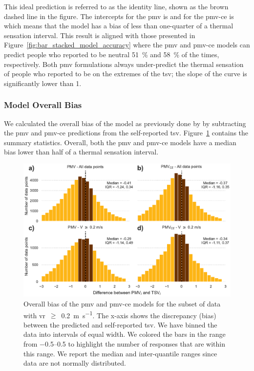 This ideal prediction is referred to as the identity line, shown as the brown dashed line in the figure.
The intercepts for the \ac{pmv} is  and for the \ac{pmv-ce} is  which means that the model has a bias of less than one-quarter of a thermal sensation interval.
This result is aligned with those presented in Figure~\ref{fig:bar_stacked_model_accuracy} where the \ac{pmv} and \ac{pmv-ce} models can predict people who reported to be neutral \qty{51}{\percent} and \qty{58}{\percent} of the times, respectively.
Both \ac{pmv} formulations always under-predict the thermal sensation of people who reported to be on the extremes of the \ac{tsv};
the slope of the curve is significantly lower than 1.

\subsubsection{Model Overall Bias}\label{subsubsec:model-overall-bias}
We calculated the overall bias of the model as previously done by  by subtracting the \ac{pmv} and \ac{pmv-ce} predictions from the self-reported \ac{tsv}.
Figure~\ref{fig:hist_discrepancies} contains the summary statistics.
Overall, both the \ac{pmv} and \ac{pmv-ce} models have a median bias lower than half of a thermal sensation interval.
\begin{figure}[htb!]
    \centering
    \includegraphics[width=\textwidth]{figures/hist_discrepancies}
    \caption{Overall bias of the \ac{pmv} and \ac{pmv-ce} models for the subset of data with \ac{vr}~$\geq$~\qty{0.2}{\m\per\s}.
    The x-axis shows the discrepancy (bias) between the predicted and self-reported \ac{tsv}.
    We have binned the data into intervals of equal width.
    We colored the bars in the range from \numrange{-.5}{.5} to highlight the number of responses that are within this range.
    We report the median and inter-quantile ranges since data are not normally distributed.
    }
    \label{fig:hist_discrepancies}
\end{figure}
